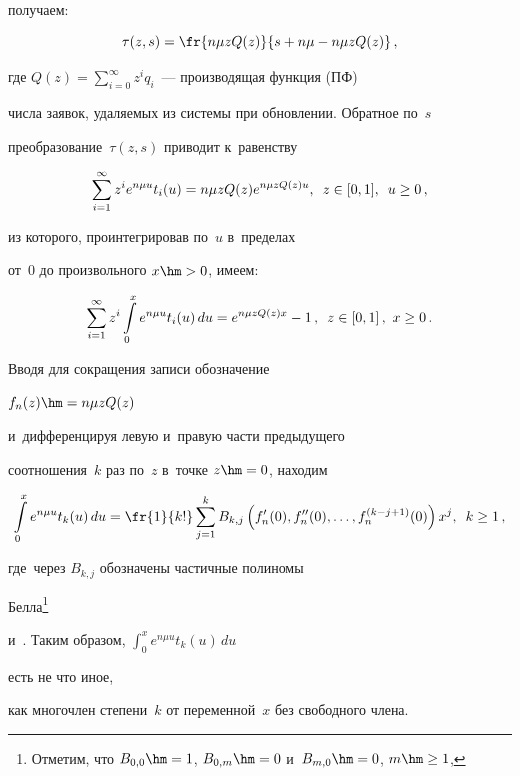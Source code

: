 получаем:

$$

\tau(z,s)= \fr{n\mu z  Q(z)}{s+n\mu - n \mu z Q(z)}\,,

$$

где $Q(z)=\sum\nolimits_{i=0}^\infty z^i q_{i}$~--- производящая функция (ПФ) 

числа заявок, удаляемых из системы при обновлении. Обратное по~$s$ 

преобразование~$\tau(z,s)$ приводит к~равенству

$$

\sum\limits_{i=1}^\infty  z^i e^{n\mu u} t_i(u)

=n\mu z Q(z) e^{n\mu z Q(z)u}, \enskip z\in [0,1], \enskip u \ge 0\,,

$$

из которого, проинтегрировав по~$u$ в~пределах

от~0 до произвольного $x\hm>0$, имеем:

$$

\sum\limits_{i=1}^\infty z^i \int\limits_0^x e^{ n\mu u} t_i(u)\,du

= e^{n\mu z Q(z) x} -1\,, \enskip z\in [0,1]\,, \ x \ge 0\,.

$$

Вводя для сокращения записи обозначение

${f_n(z)\hm=n\mu z Q(z)}$

и~дифференцируя левую и~правую части предыдущего

соотношения~$k$ раз по~$z$ в~точке $z\hm=0$, находим

\begin{equation}

\label{bell111}

\int\limits_0^x e^{ n\mu u} t_k(u) \,du

= \fr{1}{k!} \sum\limits_{j=1}^k B_{k,j} \left(

f_n'(0),f_n''(0),\dots,f_n^{(k-j+1)}(0)\right) x^j, \enskip k \ge 1\,,

\end{equation}

где~через ${B_{k,j}}$ обозначены частичные полиномы 

Белла\footnote{Отметим, что $B_{0,0}\hm=1$, $B_{0,m}\hm=0$ и~$B_{m,0}\hm=0$, $m \hm\ge 1$,}~\cite[с.~46]{bell0} 

и~\cite{bell}. Таким образом, $\int\nolimits_0^x e^{ n\mu u} t_k(u) \,du$ 

есть не что иное,

как многочлен степени~$k$ от переменной~$x$ без свободного члена.

